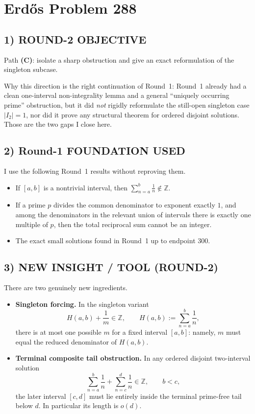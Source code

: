 \section{Erd\H{o}s Problem 288}

\subsection*{1) ROUND-2 OBJECTIVE}
Path \textbf{(C)}: isolate a sharp obstruction and give an exact reformulation of the singleton subcase.

Why this direction is the right continuation of Round~1: Round~1 already had a clean one-interval non-integrality lemma and a general ``uniquely occurring prime'' obstruction, but it did \emph{not} rigidly reformulate the still-open singleton case $|I_2|=1$, nor did it prove any structural theorem for ordered disjoint solutions. Those are the two gaps I close here.

\subsection*{2) Round-1 FOUNDATION USED}
I use the following Round~1 results without reproving them.

\begin{itemize}
	\item[(F1)] If $[a,b]$ is a nontrivial interval, then $\sum_{n=a}^b \frac1n \notin \mathbb Z$.
	\item[(F2)] If a prime $p$ divides the common denominator to exponent exactly $1$, and among the denominators in the relevant union of intervals there is exactly one multiple of $p$, then the total reciprocal sum cannot be an integer.
	\item[(F3)] The exact small solutions found in Round~1 up to endpoint $300$.
\end{itemize}

\subsection*{3) NEW INSIGHT / TOOL (ROUND-2)}
There are two genuinely new ingredients.

\begin{itemize}
	\item[(N1)] \textbf{Singleton forcing.} In the singleton variant
	\[
	H(a,b)+\frac1m\in\mathbb Z,\qquad H(a,b):=\sum_{n=a}^b \frac1n,
	\]
	there is at most one possible $m$ for a fixed interval $[a,b]$: namely, $m$ must equal the reduced denominator of $H(a,b)$.
	
	\item[(N2)] \textbf{Terminal composite tail obstruction.} In any ordered disjoint two-interval solution
	\[
	\sum_{n=a}^b\frac1n+\sum_{n=c}^d\frac1n\in\mathbb Z,\qquad b<c,
	\]
	the later interval $[c,d]$ must lie entirely inside the terminal prime-free tail below $d$. In particular its length is $o(d)$.
\end{itemize}

